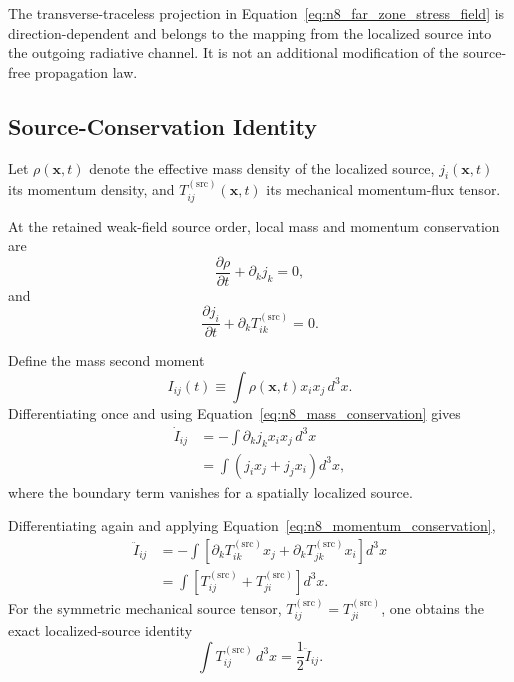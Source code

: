 The transverse-traceless projection in Equation~\eqref{eq:n8_far_zone_stress_field} is direction-dependent and belongs to the mapping from the localized source into the outgoing radiative channel. It is not an additional modification of the source-free propagation law.

\subsection{Source-Conservation Identity}
\label{subsec:n8_source_conservation}

Let $\rho(\mathbf{x},t)$ denote the effective mass density of the localized source, $j_{i}(\mathbf{x},t)$ its momentum density, and $T_{ij}^{(\mathrm{src})}(\mathbf{x},t)$ its mechanical momentum-flux tensor.

At the retained weak-field source order, local mass and momentum conservation are
\begin{equation}
    \frac{\partial\rho}{\partial t} + \partial_{k}j_{k} = 0,
    \label{eq:n8_mass_conservation}
\end{equation}
and
\begin{equation}
    \frac{\partial j_{i}}{\partial t} + \partial_{k} T_{ik}^{(\mathrm{src})} = 0.
    \label{eq:n8_momentum_conservation}
\end{equation}

Define the mass second moment
\begin{equation}
    I_{ij}(t) \equiv \int \rho(\mathbf{x},t) x_{i}x_{j} \,d^{3}x.
    \label{eq:n8_mass_second_moment}
\end{equation}
Differentiating once and using Equation~\eqref{eq:n8_mass_conservation} gives
\begin{equation}
    \begin{aligned}
        \dot{I}_{ij} &= - \int \partial_{k}j_{k} x_{i}x_{j} \,d^{3}x \\
        &= \int \left( j_{i}x_{j} + j_{j}x_{i} \right) d^{3}x,
    \end{aligned}
    \label{eq:n8_first_moment_derivative}
\end{equation}
where the boundary term vanishes for a spatially localized source.

Differentiating again and applying Equation~\eqref{eq:n8_momentum_conservation},
\begin{equation}
    \begin{aligned}
        \ddot{I}_{ij} &= - \int \left[ \partial_{k} T_{ik}^{(\mathrm{src})} x_{j} + \partial_{k} T_{jk}^{(\mathrm{src})} x_{i} \right] d^{3}x \\
        &= \int \left[ T_{ij}^{(\mathrm{src})} + T_{ji}^{(\mathrm{src})} \right] d^{3}x.
    \end{aligned}
\end{equation}
For the symmetric mechanical source tensor, $T_{ij}^{(\mathrm{src})} = T_{ji}^{(\mathrm{src})}$, one obtains the exact localized-source identity
\begin{equation}
    \int T_{ij}^{(\mathrm{src})} \,d^{3}x = \frac{1}{2} \ddot{I}_{ij}.
    \label{eq:n8_stress_quadrupole_identity}
\end{equation}

